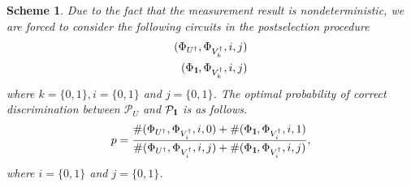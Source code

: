 \documentclass[preprint,12pt, a4paper]{elsarticle}
\newcommand{\1}{{\rm 1\hspace{-0.9mm}l}}
\newcommand{\Id}{{\rm 1\hspace{-0.9mm}l}}
\newcommand{\PP}{\mathcal{P}}
\newtheorem{scheme}{Scheme}
\begin{document}
\begin{scheme}
Due to the fact that the measurement result is nondeterministic, we are forced to consider the following circuits
in the postselection procedure
\begin{equation}
\begin{split}
(\Phi_{U^\dagger}, \Phi_{V_k^\dagger}, i, j) \\ 
(\Phi_{\Id}, \Phi_{V_k^\dagger}, i, j)
\end{split}
\end{equation}
where $k=\{0,1\}, i=\{0,1\}$ and $ j=\{0,1\}$. 
The optimal probability of correct discrimination between $\PP_{U} $ and $\PP_\Id$ is as follows.
		\begin{equation}
		p = \frac{\#(\Phi_{U^\dagger}, \Phi_{V_i^\dagger},i,0) + \#(\Phi_\Id, \Phi_{V_i^\dagger},i,1)}{\#(\Phi_{U^\dagger}, \Phi_{V_i^\dagger},i,j) + \#(\Phi_\Id, \Phi_{V_i^\dagger},i,j)}, 
		\end{equation}
where $i=\{0,1\}$ and $ j=\{0,1\}$. 

\end{scheme}
\end{document}
